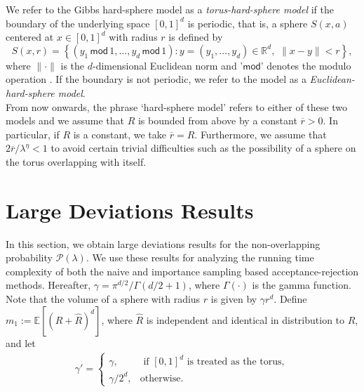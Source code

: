 \documentclass[11pt]{article}
\newcommand{\rbdd}{\overline{r}}
\newcommand{\reals}{\mathbb{R}}
\newcommand{\mbb}{\mathbb}
\newcommand{\lt}{\left}
\newcommand{\rt}{\right}
\newcommand{\wh}{\widehat}
\newcommand{\pno}{\mathcal{P}(\lambda)}
\begin{document}
We refer to the Gibbs hard-sphere  {model as a} {\em torus-hard-sphere model} if the boundary of the underlying space $[0,1]^d$ is periodic, that is, a sphere $S(x, a)$ centered at $x \in [0,1]^d$ with radius $r$ is defined by 
$$S(x, r) = \lt\{ (y_1\, \mathsf{mod}\, 1, \dots, y_d\, \mathsf{mod}\, 1): y = (y_1, \dots, y_d)\in \reals^d, \, \,\|x- y \| < r\rt\},$$ 
where $\|\cdot \|$ is the  $d$-dimensional Euclidean norm and '$\mathsf{mod}$' denotes the modulo operation \cite{Boute92}. If the boundary is not periodic, we refer to the  {model as} a {\em Euclidean-hard-sphere model}.\\

From now onwards, the phrase `hard-sphere model' refers to either of these two models and we assume that $R$ is bounded from above by a constant $\rbdd > 0$.  In particular, if $R$ is a constant, we take $\rbdd = R$. Furthermore, we assume that $2\rbdd/\lambda^\eta < 1$ to avoid certain trivial difficulties such as the possibility of a sphere on the torus overlapping with itself.

\section{Large Deviations Results}
\label{sec:LDR}
In this section, we obtain large deviations results for the non-overlapping probability $\pno$. We use these results 
for analyzing the running time complexity of both the naive and importance sampling based acceptance-rejection methods. Hereafter, $\gamma = {\pi^{d/2}}/{\Gamma(d/2 + 1)}$, where $\Gamma(\cdot)$ is the gamma function. Note that the volume of a sphere with radius $r$ is given by $\gamma r^d$.
Define $ m_1 := {\mbb E}[(R + \wh R)^{d}]$, where $\wh R$ is independent and identical in distribution to $R$, and let
\begin{align}
\label{eqn:def_gamm_prime}
\gamma' = \begin{cases}
            \gamma, &\text{ if  $[0,1]^d$ is treated as the torus},\\
            \gamma/2^d, &\text{otherwise}.
                  \end{cases}
\end{align}
 
\end{document}
